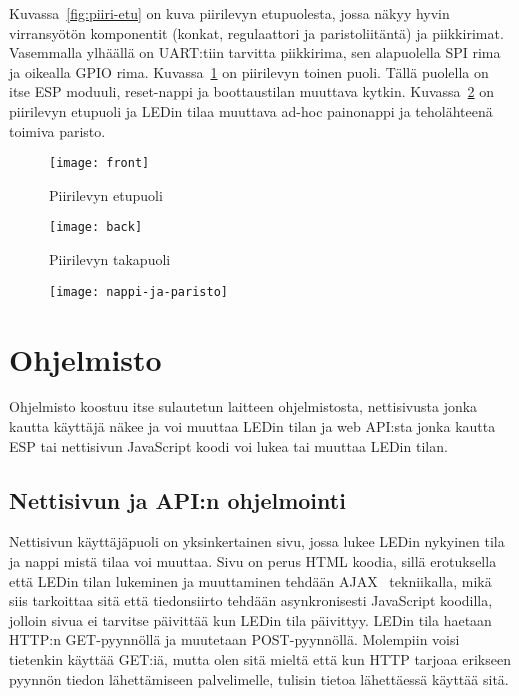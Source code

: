 Kuvassa~\ref{fig:piiri-etu} on kuva piirilevyn etupuolesta, jossa näkyy hyvin
virransyötön komponentit (konkat, regulaattori ja paristoliitäntä) ja
piikkirimat. Vasemmalla ylhäällä on UART:tiin tarvitta piikkirima, sen
alapuolella SPI rima ja oikealla GPIO rima. Kuvassa~\ref{fig:piiri-taka} on
piirilevyn toinen puoli. Tällä puolella on itse ESP moduuli, reset-nappi ja
boottaustilan muuttava kytkin. Kuvassa~\ref{fig:nappi-ja-paristo} on piirilevyn
etupuoli ja LEDin tilaa muuttava ad-hoc painonappi ja teholähteenä toimiva
paristo.
\begin{figure}[H]
\centering
\begin{minipage}{.5\textwidth}
  \centering
  \texttt{[image: front]}
  \caption{Piirilevyn etupuoli}
\label{fig:piiri-etu}
\end{minipage}%
\begin{minipage}{.5\textwidth}
  \centering
  \texttt{[image: back]}
  \caption{Piirilevyn takapuoli}
\label{fig:piiri-taka}
\end{minipage}
\end{figure}
\begin{figure}[H]
  \centering
  \texttt{[image: nappi-ja-paristo]}
  \caption{}
\label{fig:nappi-ja-paristo}
\end{figure}

\section{Ohjelmisto}
Ohjelmisto koostuu itse sulautetun laitteen ohjelmistosta, nettisivusta jonka
kautta käyttäjä näkee ja voi muuttaa LEDin tilan ja web API:sta jonka kautta
ESP tai nettisivun JavaScript koodi voi lukea tai muuttaa LEDin tilan.

\subsection{Nettisivun ja API:n ohjelmointi}
Nettisivun käyttäjäpuoli on yksinkertainen sivu, jossa lukee LEDin nykyinen
tila ja nappi mistä tilaa voi muuttaa. Sivu on perus HTML koodia, sillä
erotuksella että LEDin tilan lukeminen ja muuttaminen tehdään AJAX~\cite{ajax}
tekniikalla, mikä siis tarkoittaa sitä että tiedonsiirto tehdään asynkronisesti
JavaScript koodilla, jolloin sivua ei tarvitse päivittää kun LEDin tila
päivittyy. LEDin tila haetaan HTTP:n GET-pyynnöllä ja muutetaan POST-pyynnöllä.
Molempiin voisi tietenkin käyttää GET:iä, mutta olen sitä mieltä että kun HTTP
tarjoaa erikseen pyynnön tiedon lähettämiseen palvelimelle, tulisin tietoa
lähettäessä käyttää sitä.


